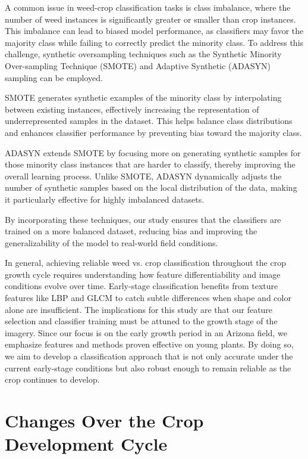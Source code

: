 \documentclass[letterpaper]{report}
\begin{document}
A common issue in weed-crop classification tasks is class imbalance, where the number of weed instances is significantly greater or smaller than crop instances. This imbalance can lead to biased model performance, as classifiers may favor the majority class while failing to correctly predict the minority class. To address this challenge, synthetic oversampling techniques such as the Synthetic Minority Over-sampling Technique (SMOTE) and Adaptive Synthetic (ADASYN) sampling can be employed.

SMOTE generates synthetic examples of the minority class by interpolating between existing instances, effectively increasing the representation of underrepresented samples in the dataset. This helps balance class distributions and enhances classifier performance by preventing bias toward the majority class.

ADASYN extends SMOTE by focusing more on generating synthetic samples for those minority class instances that are harder to classify, thereby improving the overall learning process. Unlike SMOTE, ADASYN dynamically adjusts the number of synthetic samples based on the local distribution of the data, making it particularly effective for highly imbalanced datasets.

By incorporating these techniques, our study ensures that the classifiers are trained on a more balanced dataset, reducing bias and improving the generalizability of the model to real-world field conditions.

In general, achieving reliable weed vs. crop classification throughout the crop growth cycle requires understanding how feature differentiability and image conditions evolve over time. Early-stage classification benefits from texture features like LBP and GLCM to catch subtle differences when shape and color alone are insufficient. The implications for this study are that our feature selection and classifier training must be attuned to the growth stage of the imagery. Since our focus is on the early growth period in an Arizona field, we emphasize features and methods proven effective on young plants. By doing so, we aim to develop a classification approach that is not only accurate under the current early-stage conditions but also robust enough to remain reliable as the crop continues to develop.

\section{Changes Over the Crop Development Cycle}
\end{document}
